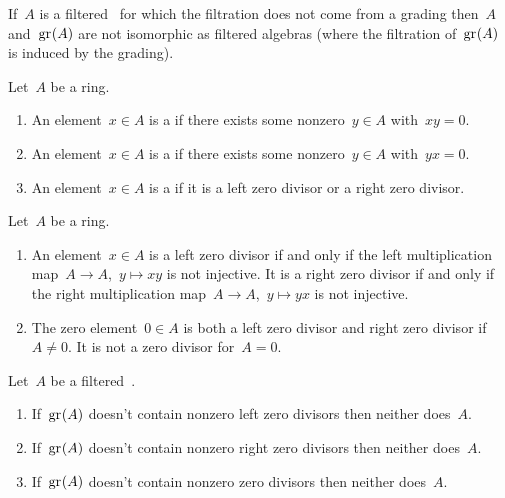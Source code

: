 \begin{warning}
  If~$A$ is a filtered~{\algebra{$\kf$}} for which the filtration does not come from a grading then~$A$ and~$\gr(A)$ are not isomorphic as filtered algebras (where the filtration of~$\gr(A)$ is induced by the grading).
\end{warning}


\begin{definition}
  Let~$A$ be a ring.
  \begin{enumerate}
    \item
      An element~$x \in A$ is a  if there exists some nonzero~$y \in A$ with~$xy = 0$.
    \item
      An element~$x \in A$ is a  if there exists some nonzero~$y \in A$ with~$yx = 0$.
    \item
      An element~$x \in A$ is a  if it is a left zero divisor or a right zero divisor.
  \end{enumerate}
\end{definition}


\begin{remark}
  Let~$A$ be a ring.
  \begin{enumerate}
    \item
      An element~$x \in A$ is a left zero divisor if and only if the left multiplication map~$A \to A$,~$y \mapsto xy$ is not injective.
      It is a right zero divisor if and only if the right multiplication map~$A \to A$,~$y \mapsto yx$ is not injective.
    \item
      The zero element~$0 \in A$ is both a left zero divisor and right zero divisor if~$A \neq 0$.
      It is not a zero divisor for~$A = 0$.
  \end{enumerate}
\end{remark}


\begin{proposition}
  \label{associated graded algebra and zero divisors}
  Let~$A$ be a filtered~{\algebra{$\kf$}}.
  \begin{enumerate}
    \item
      \label{associated graded has left zero divisors}
      If~$\gr(A)$ doesn’t contain nonzero left zero divisors then neither does~$A$.
    \item
      \label{associated graded has right zero divisors}
      If~$\gr(A)$ doesn’t contain nonzero right zero divisors then neither does~$A$.
    \item
      If~$\gr(A)$ doesn’t contain nonzero zero divisors then neither does~$A$.
  \end{enumerate}
\end{proposition}


